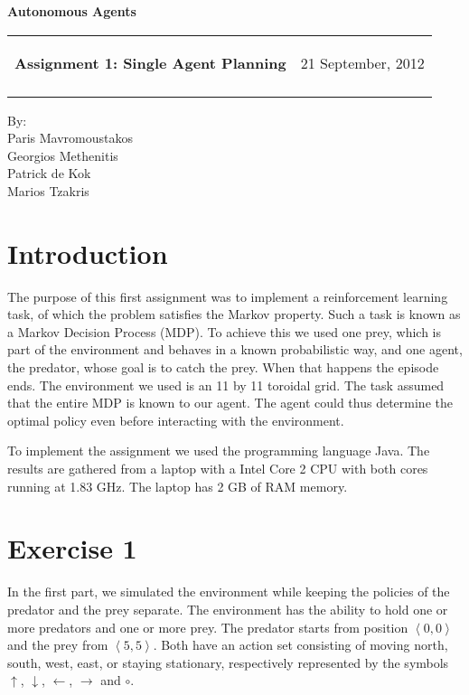 \documentclass[a4paper,11pt]{article}
\makeatletter
\newcommand{\resheading}[1]{{\large \colorbox{mygrey}{\begin{minipage}{\textwidth}{\textbf{#1 \vphantom{p\^{E}}}}\end{minipage}}}}
\newcommand{\mywebheader}{
  \begin{tabular}{@{}p{5in}p{4in}}
  {\resheading{Assignment 1: Single Agent Planning}} & {\Large 21 September, 2012}\\\vspace{0.2cm}
  \end{tabular}}
\makeatother
\begin{document}
\begin{center}
{\LARGE \textbf{Autonomous Agents}}\\ [1em]
\end{center}
\mywebheader

\begin{center}
{\Large By:} \\ \vspace{0.1cm}
{\Large Paris Mavromoustakos} \\  \vspace{0.1cm}
{\Large Georgios Methenitis} \\ \vspace{0.1cm}
{\Large Patrick de Kok} \\ \vspace{0.1cm}
{\Large Marios Tzakris}
\end{center}




\section*{Introduction}
The purpose of this first assignment was to implement a reinforcement learning task, of which the problem satisfies the Markov property.  Such a task is known as a Markov Decision Process (MDP).  To achieve this we used one prey, which is part of the environment and behaves in a known probabilistic way, and one agent, the predator, whose goal is to catch the prey.  When that happens the episode ends.  The environment we used is an 11 by 11 toroidal grid.  The task assumed that the entire MDP is known to our agent.  The agent could thus determine the optimal policy even before interacting with the environment.  

To implement the assignment we used the programming language Java.  The results are gathered from a laptop with a Intel Core 2 CPU with both cores running at 1.83 GHz.  The laptop has 2 GB of RAM memory.

\section*{Exercise 1}
In the first part, we simulated the environment while keeping the policies of the predator and the prey separate.  The environment has the ability to hold one or more predators and one or more prey.  The predator starts from position $\left<0,0\right>$ and the prey from $\left<5,5\right>$.  Both have an action set consisting of moving north, south, west, east, or staying stationary, respectively represented by the symbols $\uparrow$, $\downarrow$, $\leftarrow$, $\rightarrow$ and $\circ$. 
\end{document}
